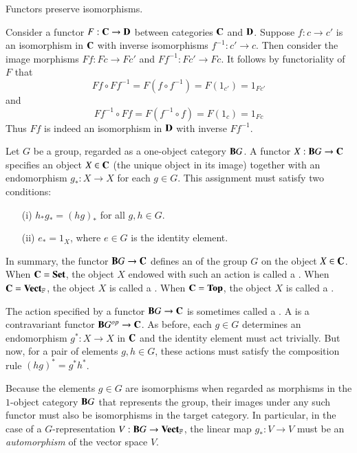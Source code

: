 \documentclass[12pt]{report}
\begin{document}
\begin{lem}{}{}
    Functors preserve isomorphisms.
\end{lem}
\begin{proof*}{}{}
    Consider a functor $F:\normalfont\textbf{C}\rightarrow \normalfont\textbf{D}$ between categories $\normalfont\textbf{C}$ and $\normalfont\textbf{D}$. Suppose $f:c\rightarrow c'$ is an isomorphism in $\normalfont\textbf{C}$ with inverse isomorphisms $f^{-1}:c'\rightarrow c$. Then consider the image morphisms $Ff:Fc\rightarrow Fc'$ and $Ff^{-1}:Fc'\rightarrow Fc$. It follows by functoriality of $F$ that \begin{equation*}
        Ff\circ Ff^{-1} = F(f\circ f^{-1}) = F(1_{c'}) = 1_{Fc'}
    \end{equation*}
    and \begin{equation*}
        Ff^{-1}\circ Ff = F(f^{-1}\circ f) = F(1_c) = 1_{Fc}
    \end{equation*}
    Thus $Ff$ is indeed an isomorphism in $\normalfont\textbf{D}$ with inverse $Ff^{-1}$.
\end{proof*}


\begin{eg}{}{}
    Let $G$ be a group, regarded as a one-object category $\normalfont\textbf{B}G$. A functor $X:\normalfont\textbf{B}G\rightarrow \normalfont\textbf{C}$ specifies an object $X \in \normalfont\textbf{C}$ (the unique object in its image) together with an endomorphism $g_*:X\rightarrow X$ for each $g \in G$. This assignment must satisfy two conditions: \begin{enumerate}
        \item[(i)] $h_*g_* = (hg)_*$ for all $g,h \in G$.
        \item[(ii)] $e_* = 1_X$, where $e \in G$ is the identity element.
    \end{enumerate}
    In summary, the functor $\normalfont\textbf{B}G\rightarrow \normalfont\textbf{C}$ defines an  of the group $G$ on the object $X \in \normalfont\textbf{C}$. When $\normalfont\textbf{C} = \normalfont\textbf{Set}$, the object $X$ endowed with such an action is called a . When $\normalfont\textbf{C} = \normalfont\textbf{Vect}_{\mathbb{F}}$, the object $X$ is called a . When $\normalfont\textbf{C} = \normalfont\textbf{Top}$, the object $X$ is called a . 

    The action specified by a functor $\normalfont\textbf{B}G\rightarrow \normalfont\textbf{C}$ is sometimes called a . A  is a contravariant functor $\normalfont\textbf{B}G^{op}\rightarrow \normalfont\textbf{C}$. As before, each $g \in G$ determines an endomorphism $g^*:X\rightarrow X$ in $\normalfont\textbf{C}$ and the identity element must act trivially. But now, for a pair of elements $g,h \in G$, these actions must satisfy the composition rule $(hg)^* = g^*h^*$. 


    Because the elements $g \in G$ are isomorphisms when regarded as morphisms in the $1$-object category $\normalfont\textbf{B}G$ that represents the group, their images under any such functor must also be isomorphisms in the target category. In particular, in the case of a $G$-representation $V:\normalfont\textbf{B}G\rightarrow \normalfont\textbf{Vect}_{\mathbb{F}}$, the linear map $g_*:V\rightarrow V$ must be an \emph{automorphism} of the vector space $V$. 
\end{eg}
\end{document}
